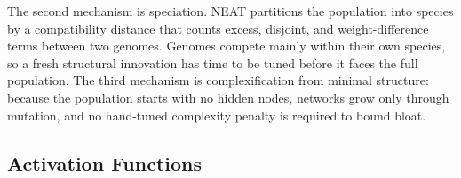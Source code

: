\documentclass[12pt]{article}
\begin{document}
The second mechanism is speciation.
NEAT partitions the population into species by a compatibility distance that counts excess, disjoint, and weight-difference terms between two genomes.
Genomes compete mainly within their own species, so a fresh structural innovation has time to be tuned before it faces the full population.
The third mechanism is complexification from minimal structure: because the population starts with no hidden nodes, networks grow only through mutation, and no hand-tuned complexity penalty is required to bound bloat.



\subsection{Activation Functions}
\label{subsec:activation-functions} 
\end{document}
